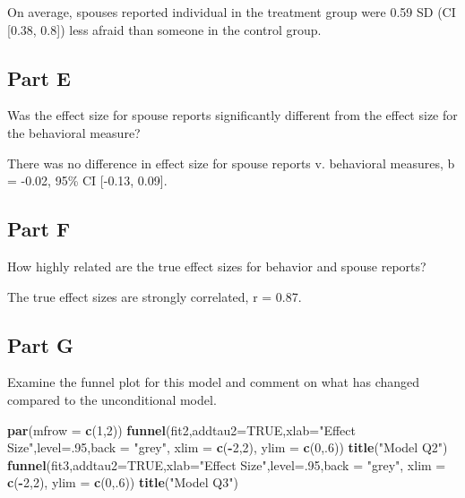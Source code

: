 \documentclass[]{article}
\newenvironment{Shaded}{\begin{snugshade}}{\end{snugshade}}
\newcommand{\KeywordTok}[1]{\textcolor[rgb]{0.13,0.29,0.53}{\textbf{#1}}}
\newcommand{\DataTypeTok}[1]{\textcolor[rgb]{0.13,0.29,0.53}{#1}}
\newcommand{\DecValTok}[1]{\textcolor[rgb]{0.00,0.00,0.81}{#1}}
\newcommand{\StringTok}[1]{\textcolor[rgb]{0.31,0.60,0.02}{#1}}
\newcommand{\OtherTok}[1]{\textcolor[rgb]{0.56,0.35,0.01}{#1}}
\newcommand{\OperatorTok}[1]{\textcolor[rgb]{0.81,0.36,0.00}{\textbf{#1}}}
\newcommand{\NormalTok}[1]{#1}
\begin{document}
On average, spouses reported individual in the treatment group were 0.59
SD (CI {[}0.38, 0.8{]}) less afraid than someone in the control group.

\subsection{Part E}\label{part-e}

Was the effect size for spouse reports significantly different from the
effect size for the behavioral measure?

There was no difference in effect size for spouse reports v. behavioral
measures, b = -0.02, 95\% CI {[}-0.13, 0.09{]}.

\subsection{Part F}\label{part-f}

How highly related are the true effect sizes for behavior and spouse
reports?

The true effect sizes are strongly correlated, r = 0.87.

\subsection{Part G}\label{part-g}

Examine the funnel plot for this model and comment on what has changed
compared to the unconditional model.

\begin{Shaded}
\begin{Highlighting}[]
\KeywordTok{par}\NormalTok{(}\DataTypeTok{mfrow =} \KeywordTok{c}\NormalTok{(}\DecValTok{1}\NormalTok{,}\DecValTok{2}\NormalTok{))}
\KeywordTok{funnel}\NormalTok{(fit2,}\DataTypeTok{addtau2=}\OtherTok{TRUE}\NormalTok{,}\DataTypeTok{xlab=}\StringTok{"Effect Size"}\NormalTok{,}\DataTypeTok{level=}\NormalTok{.}\DecValTok{95}\NormalTok{,}\DataTypeTok{back =} \StringTok{"grey"}\NormalTok{, }\DataTypeTok{xlim =} \KeywordTok{c}\NormalTok{(}\OperatorTok{-}\DecValTok{2}\NormalTok{,}\DecValTok{2}\NormalTok{), }\DataTypeTok{ylim =} \KeywordTok{c}\NormalTok{(}\DecValTok{0}\NormalTok{,.}\DecValTok{6}\NormalTok{))}
\KeywordTok{title}\NormalTok{(}\StringTok{"Model Q2"}\NormalTok{)}
\KeywordTok{funnel}\NormalTok{(fit3,}\DataTypeTok{addtau2=}\OtherTok{TRUE}\NormalTok{,}\DataTypeTok{xlab=}\StringTok{"Effect Size"}\NormalTok{,}\DataTypeTok{level=}\NormalTok{.}\DecValTok{95}\NormalTok{,}\DataTypeTok{back =} \StringTok{"grey"}\NormalTok{, }\DataTypeTok{xlim =} \KeywordTok{c}\NormalTok{(}\OperatorTok{-}\DecValTok{2}\NormalTok{,}\DecValTok{2}\NormalTok{), }\DataTypeTok{ylim =} \KeywordTok{c}\NormalTok{(}\DecValTok{0}\NormalTok{,.}\DecValTok{6}\NormalTok{))}
\KeywordTok{title}\NormalTok{(}\StringTok{"Model Q3"}\NormalTok{)}
\end{Highlighting}
\end{Shaded}
\end{document}
